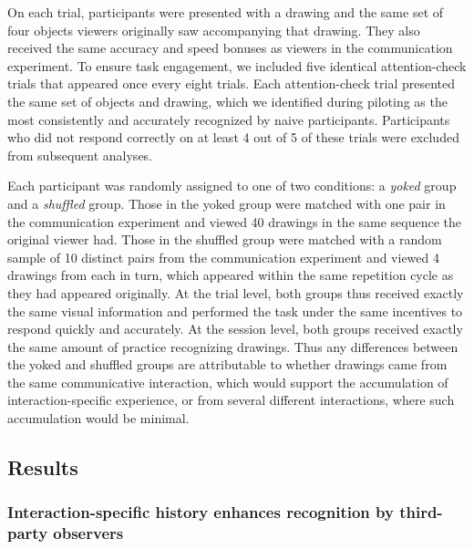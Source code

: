 \documentclass[10pt,letterpaper]{article}
\begin{document}
On each trial, participants were presented with a drawing and the same set of four objects viewers originally saw accompanying that drawing.
They also received the same accuracy and speed bonuses as viewers in the communication experiment.
To ensure task engagement, we included five identical attention-check trials that appeared once every eight trials.
Each attention-check trial presented the same set of objects and drawing, which we identified during piloting as the most consistently and accurately recognized by naive participants.
Participants who did not respond correctly on at least 4 out of 5 of these trials were excluded from subsequent analyses.

Each participant was randomly assigned to one of two conditions: a \textit{yoked} group and a \textit{shuffled} group.
Those in the yoked group were matched with one pair in the communication experiment and viewed 40 drawings in the same sequence the original viewer had.
Those in the shuffled group were matched with a random sample of 10 distinct pairs from the communication experiment and viewed 4 drawings from each in turn, which appeared within the same repetition cycle as they had appeared originally.
At the trial level, both groups thus received exactly the same visual information and performed the task under the same incentives to respond quickly and accurately.
At the session level, both groups received exactly the same amount of practice recognizing drawings.
Thus any differences between the yoked and shuffled groups are attributable to whether drawings came from the same communicative interaction, which would support the accumulation of interaction-specific experience, or from several different interactions, where such accumulation would be minimal.

\subsection{Results}

\subsubsection{Interaction-specific history enhances recognition by third-party observers}

\end{document}
